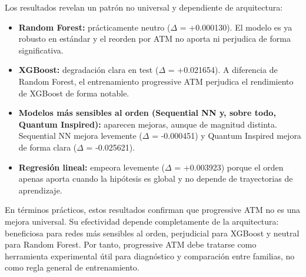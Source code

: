 Los resultados revelan un patrón no universal y dependiente de arquitectura:

\begin{itemize}
	\item \textbf{Random Forest:} prácticamente neutro ($\Delta$ = +0.000130). El modelo es ya robusto en estándar y el reorden por ATM no aporta ni perjudica de forma significativa.
	\item \textbf{XGBoost:} degradación clara en test ($\Delta$ = +0.021654). A diferencia de Random Forest, el entrenamiento progressive ATM perjudica el rendimiento de XGBoost de forma notable.
	\item \textbf{Modelos más sensibles al orden (Sequential NN y, sobre todo, Quantum Inspired):} aparecen mejoras, aunque de magnitud distinta. Sequential NN mejora levemente ($\Delta$ = -0.000451) y Quantum Inspired mejora de forma clara ($\Delta$ = -0.025621).
	\item \textbf{Regresión lineal:} empeora levemente ($\Delta$ = +0.003923) porque el orden apenas aporta cuando la hipótesis es global y no depende de trayectorias de aprendizaje.
\end{itemize}

En términos prácticos, estos resultados confirman que progressive ATM no es una mejora universal. Su efectividad depende completamente de la arquitectura: beneficiosa para redes más sensibles al orden, perjudicial para XGBoost y neutral para Random Forest. Por tanto, progressive ATM debe tratarse como herramienta experimental útil para diagnóstico y comparación entre familias, no como regla general de entrenamiento.